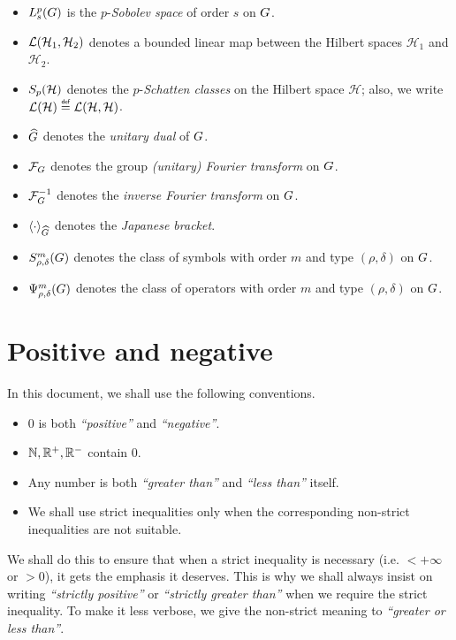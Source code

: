 \begin{itemize}
    \item $L^{p}_{s}(G)$ is the $p$-\emph{Sobolev space} of order $s$ on $G$.
    \item ${\mathcal{L} (\mathcal H_1, \mathcal H_2)}$ denotes a bounded linear map between the Hilbert spaces $\mathcal H_1$ and $\mathcal H_2$.
    \item $S_{p}(\mathcal H)$ denotes the $p$-\emph{Schatten classes} on the Hilbert space $\mathcal H$; also, we write $\Lin {\mathcal H} \defeq \Lin {\mathcal H, \mathcal H}$.
    \item ${\widehat{G}}$ denotes the \emph{unitary dual} of $G$.
    \item $\mathcal{F}_{G}$ denotes the group \emph{(unitary) Fourier transform} on $G$.
    \item $\mathcal{F}^{-1}_{G}$ denotes the \emph{inverse Fourier transform} on $G$.
    \item ${\langle \cdot \rangle}_{{\widehat{G}}}$ denotes the \emph{Japanese bracket}.
    \item $S^{m}_{\rho, \delta}(G)$ denotes the class of symbols with order $m$ and type $(\rho, \delta)$ on $G$.
    \item $\Psi^{m}_{\rho, \delta}(G)$ denotes the class of operators with order $m$ and type $(\rho, \delta)$ on $G$.
\end{itemize}

\section*{Positive and negative}

In this document, we shall use the following conventions.

\begin{itemize}
    \item $0$ is both \emph{``positive''} and \emph{``negative''}.
    \item $\mathbb{N}, \mathbb{R}^+, \mathbb{R}^-$ contain $0$.
    \item Any number is both \emph{``greater than''} and \emph{``less than''} itself.
    \item We shall use strict inequalities only
        when the corresponding non-strict inequalities are not suitable.
\end{itemize}

We shall do this to ensure that
when a strict inequality is necessary (i.e. $< +\infty$ or $> 0$),
it gets the emphasis it deserves.
This is why we shall always insist on writing \emph{``strictly positive''} or \emph{``strictly greater than''} when we require the strict inequality.
To make it less verbose,
we give the non-strict meaning to \emph{``greater or less than''}.

